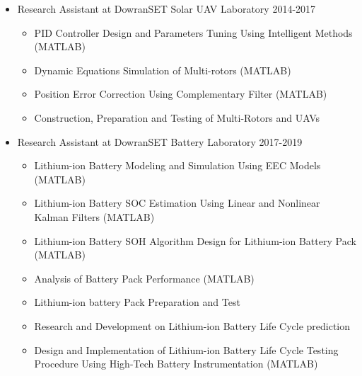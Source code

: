 \documentclass[10pt,a4paper,sans]{moderncv} %
\begin{document}
		\vspace{0.5em}
		
		\begin{itemize}[nosep, leftmargin=0.9cm ]
			\item Research Assistant at DowranSET Solar UAV Laboratory \hfill 2014-2017
			\begin{itemize}[nosep]
				\item PID Controller Design and Parameters Tuning Using Intelligent Methods (MATLAB)
				\item Dynamic Equations Simulation of Multi-rotors (MATLAB)
				\item Position Error Correction Using Complementary Filter (MATLAB)
				\item Construction, Preparation and Testing of Multi-Rotors and UAVs
			\end{itemize}
		\end{itemize}
    	
		\vspace{0.3em}
		
		\begin{itemize}[nosep, leftmargin=0.9cm ]
		    \item Research Assistant at DowranSET Battery Laboratory \hfill 2017-2019
		    \begin{itemize}[nosep]
		        \item Lithium-ion Battery Modeling and Simulation Using EEC Models (MATLAB) %
		        \item Lithium-ion Battery SOC Estimation Using Linear and Nonlinear Kalman Filters (MATLAB) %
		        \item Lithium-ion Battery SOH Algorithm Design for Lithium-ion Battery Pack (MATLAB)
		        \item Analysis of Battery Pack Performance (MATLAB)
		        \item Lithium-ion battery Pack Preparation and Test
		        \item Research and Development on Lithium-ion Battery Life Cycle prediction 
		        \item Design and Implementation of Lithium-ion Battery Life Cycle Testing Procedure Using High-Tech Battery Instrumentation (MATLAB) %
		    \end{itemize}
		\end{itemize}
		
\end{document}
